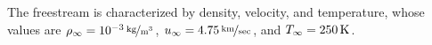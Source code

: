 The freestream is characterized by density, velocity, and temperature, whose values are $\rho_\infty=\unitfrac[10^{-3}]{kg}{m^3}$, $u_\infty=\unitfrac[4.75]{km}{sec}$, and $T_\infty=\unit[250]{K}$.
\begin{figure}[hbtp]
  \begin{center}
     \\

\end{center}
\end{figure}
